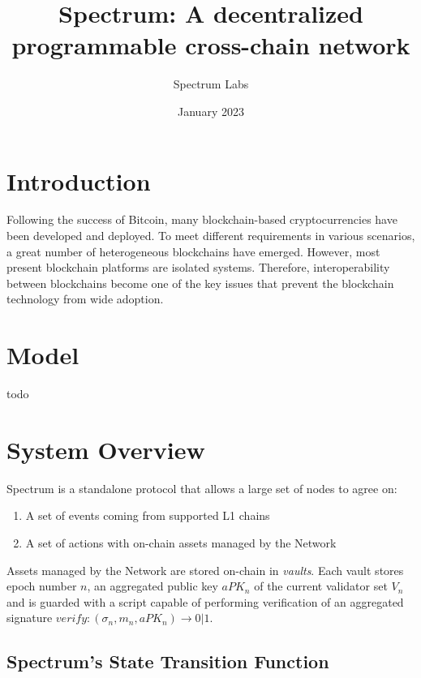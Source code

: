 \documentclass{article}
\title{Spectrum: A decentralized programmable cross-chain network}
\author{Spectrum Labs}
\date{January 2023}
\begin{document}
    \maketitle

    \section{Introduction}\label{sec:introduction}

    Following the success of Bitcoin, many blockchain-based cryptocurrencies have been developed and deployed.
    To meet different requirements in various scenarios, a great number of heterogeneous blockchains have emerged.
    However, most present blockchain platforms are isolated systems.
    Therefore, interoperability between blockchains become one of the key issues
    that prevent the blockchain technology from wide adoption.


    \section{Model}\label{sec:model}

    todo

    \section{System Overview}\label{sec:system-overview}

    Spectrum is a standalone protocol that allows a large set of nodes to agree on:
    \begin{enumerate}
        \item A set of events coming from supported L1 chains
        \item A set of actions with on-chain assets managed by the Network
    \end{enumerate}

    Assets managed by the Network are stored on-chain in \emph{vaults}.
    Each vault stores epoch number $n$, an aggregated public key $aPK_n$ of the current validator set $V_n$ and
    is guarded with a script capable of performing verification of
    an aggregated signature $verify: (\sigma_n, m_n, aPK_n) \rightarrow 0 | 1$.

    \subsection{Spectrum's State Transition Function}\label{subsec:spectrum's-state-transition-function}
\end{document}
